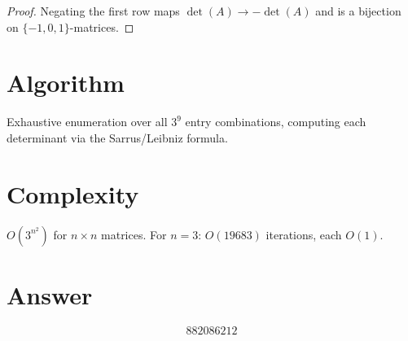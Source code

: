 \documentclass[11pt]{article}
\begin{document}
\begin{proof}
Negating the first row maps $\det(A) \to -\det(A)$ and is a bijection on $\{-1,0,1\}$-matrices.
\end{proof}

\section{Algorithm}

Exhaustive enumeration over all $3^9$ entry combinations, computing each determinant via the Sarrus/Leibniz formula.

\section{Complexity}

$O(3^{n^2})$ for $n \times n$ matrices. For $n = 3$: $O(19683)$ iterations, each $O(1)$.

\section{Answer}

\[
\boxed{882086212}
\]
\end{document}
